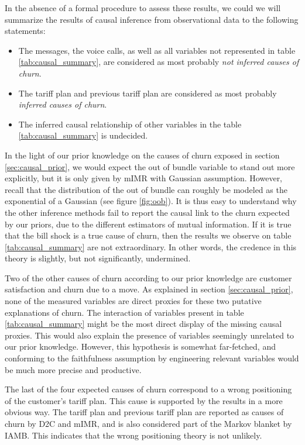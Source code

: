 In the absence of a formal procedure to assess these results, we could we will
summarize the results of causal inference from observational data to the
following statements:

\begin{itemize}
    \item The  messages, the voice calls, as well as all variables not
    represented in table \ref{tab:causal_summary}, are considered as most
    probably \emph{not inferred causes of churn}.
    \item The tariff plan and previous tariff plan are considered as most
    probably \emph{inferred causes of churn}.
    \item The inferred causal relationship of other variables in the table
    \ref{tab:causal_summary} is undecided.
\end{itemize}

In the light of our prior knowledge on the causes of churn exposed in section
\ref{sec:causal_prior}, we would expect the out of bundle variable to stand out
more explicitly, but it is only given by mIMR with Gaussian assumption. However,
recall that the distribution of the out of bundle can roughly be modeled as the
exponential of a Gaussian (see figure \ref{fig:oob}). It is thus easy to
understand why the other inference methods fail to report the causal link to the
churn expected by our priors, due to the different estimators of mutual
information. If it is true that the bill shock is a true cause of churn, then
the results we observe on table \ref{tab:causal_summary} are not extraordinary.
In other words, the credence in this theory is slightly, but not significantly,
undermined.

Two of the other causes of churn according to our prior knowledge are customer
satisfaction and churn due to a move. As explained in section
\ref{sec:causal_prior}, none of the measured variables are direct proxies for
these two putative explanations of churn. The interaction of variables present
in table \ref{tab:causal_summary} might be the most direct display of the
missing causal proxies. This would also explain the presence of variables
seemingly unrelated to our prior knowledge. However, this hypothesis is somewhat
far-fetched, and conforming to the faithfulness assumption by engineering
relevant variables would be much more precise and productive.

The last of the four expected causes of churn correspond to a wrong positioning
of the customer's tariff plan. This cause is supported by the results in a more
obvious way. The tariff plan and previous tariff plan are reported as causes of
churn by D2C and mIMR, and is also considered part of the Markov blanket by
IAMB. This indicates that the wrong positioning theory is not unlikely.
